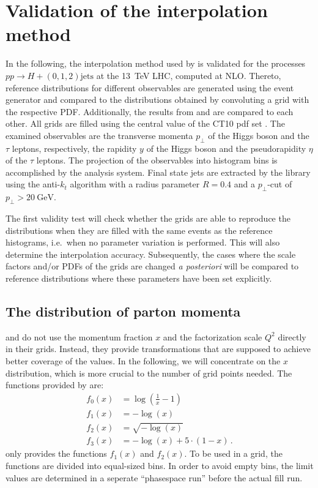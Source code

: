 
\chapter{Validation of the interpolation method}
\label{ch:validation}
%
In the following, the interpolation method used by \mcgrid{} is validated for the processes $pp \rightarrow H + (0,1,2) \text{jets}$ at the \SI{13}{\tera\electronvolt} LHC, computed at NLO.
Thereto, reference distributions for different observables are generated using the \sherpa{} event generator and compared to the distributions obtained by convoluting a grid with the respective PDF.
Additionally, the results from \appl{} and \fnlo{} are compared to each other.
All grids are filled using the central value of the CT10 pdf set \cite{ct10}.
The examined observables are the transverse momenta $p_\perp$ of the Higgs boson and the $\tau$ leptons, respectively, the rapidity $y$ of the Higgs boson and the pseudorapidity $\eta$ of the $\tau$ leptons.
The projection of the observables into histogram bins is accomplished by the \rivet{} analysis system.
Final state jets are extracted by the \fastjet{} library \cite{fastjet_manual} using the anti-$k_t$ algorithm \cite{anti_kt} with a radius parameter $R=0.4$ and a $p_\perp$-cut of $p_\perp > \SI{20}{\giga\electronvolt}$.

The first validity test will check whether the grids are able to reproduce the distributions when they are filled with the same events as the reference histograms, i.e.\ when no parameter variation is performed.
This will also determine the interpolation accuracy.
Subsequently, the cases where the scale factors and/or PDFs of the grids are changed \textit{a posteriori} will be compared to reference distributions where these parameters have been set explicitly.
%
\section{The distribution of parton momenta}
\label{sec:xtransform}
\appl{} and \fnlo{} do not use the momentum fraction $x$ and the factorization scale $Q^2$ directly in their grids.
Instead, they provide transformations that are supposed to achieve better coverage of the values.
In the following, we will concentrate on the $x$ distribution, which is more crucial to the number of grid points needed.
The functions provided by \appl{} are:
%
\begin{align}
	f_0(x)	&= \log(\frac{1}{x} -1) \\
	f_1(x)	&= -\log(x) \\
	f_2(x)	&= \sqrt{-\log(x)} \\
	f_3(x)	&= -\log(x) + 5 \cdot (1-x) \, .
\end{align}
%
\fnlo{} only provides the functions $f_1(x)$ and $f_2(x)$.
To be used in a grid, the functions are divided into equal-sized bins.
In order to avoid empty bins, the limit values are determined in a seperate \enquote{phasespace run} before the actual fill run.

